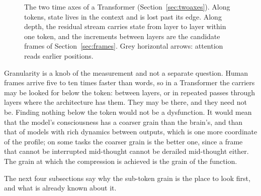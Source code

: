 \begin{figure}[t]
\centering
{}
\caption{The two time axes of a Transformer (Section~\ref{sec:twoaxes}). Along tokens, state lives in
the context and is lost past its edge. Along depth, the residual stream carries state from layer to
layer within one token, and the increments between layers are the candidate frames of
Section~\ref{sec:frames}. Grey horizontal arrows: attention reads earlier positions.}
\label{fig:axes}
\end{figure}

Granularity is a knob of the measurement and not a separate question. Human frames arrive five to ten
times faster than words, so in a Transformer the carriers may be looked for below the token: between
layers, or in repeated passes through layers where the architecture has them. They may be there, and
they need not be. Finding nothing below the token would not be a dysfunction. It would mean that the model's consciousness has a
coarser grain than the brain's, and than that of models with rich dynamics between outputs, which is one
more coordinate of the profile; on some tasks the coarser grain is the better one, since a frame that
cannot be interrupted mid-thought cannot be derailed mid-thought either. The grain at which the
compression is achieved is the grain of the function.

The next four subsections say why the sub-token grain is the place to look first, and what is already
known about it.


